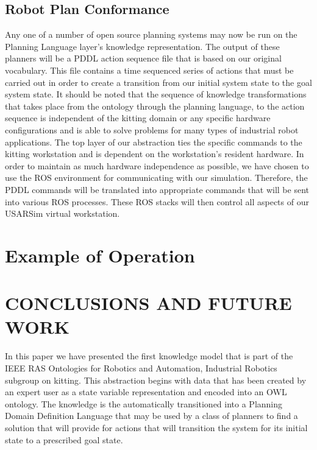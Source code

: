 \documentclass[a4paper, 10pt, conference]{ieeeconf}      %
\begin{document}
\subsection{Robot Plan Conformance}
\label{subsect:RobotPlan}
Any one of a number of open source planning systems may now be run on the Planning Language layer's knowledge representation. The output of these planners will be
a PDDL action sequence file that is based on our original vocabulary. This file
contains a time sequenced series of actions that must be carried out in order to create a transition from our initial system state to the goal system state. It should be noted that
the sequence of knowledge transformations that takes place from the ontology through the planning language, to the action sequence is independent of the kitting domain or any specific hardware configurations and is able to solve problems for many types of industrial robot applications.
The top layer of our abstraction ties the specific commands to the kitting workstation and is dependent on the workstation's resident hardware.  In order to maintain as
much hardware independence as possible, we have chosen to use the ROS environment for communicating with our simulation. Therefore, the PDDL commands will
be translated into appropriate commands that will be sent into various ROS processes. These ROS stacks will then control all aspects of our USARSim virtual workstation.

\section{Example of Operation}
\label{sect:Example}




\section{CONCLUSIONS AND FUTURE WORK}
\label{sect:Conclusions}
In this paper we have presented the first knowledge model that is part of the IEEE RAS Ontologies for Robotics and Automation, Industrial Robotics subgroup on kitting.
This abstraction begins with data that has been created by an expert user as a state variable representation and encoded into an OWL ontology. The knowledge
is the automatically transitioned into a Planning Domain Definition Language that may be used by a class of planners to find a solution that will provide for actions that will
transition the system for its initial state to a prescribed goal state.
\end{document}
